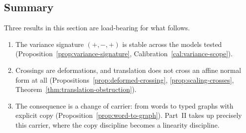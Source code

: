 \subsection{Summary}

Three results in this section are load-bearing for what follows.

\begin{enumerate}
\item The variance signature $(+,-,+)$ is stable across the models tested
  (Proposition~\ref{prop:variance-signature}, Calibration~\ref{cal:variance-scope}).
\item Crossings are deformations, and translation does not cross an affine normal form
  at all (Propositions~\ref{prop:deformed-crossing}, \ref{prop:scaling-crosses},
  Theorem~\ref{thm:translation-obstruction}).
\item The consequence is a change of carrier: from words to typed graphs with explicit
  copy (Proposition~\ref{prop:word-to-graph}).  Part~II takes up precisely this
  carrier, where the copy discipline becomes a linearity discipline.
\end{enumerate}
